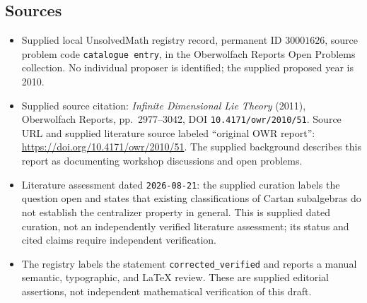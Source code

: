 \documentclass[11pt]{article}
\begin{document}
\subsection{Sources}
\begin{itemize}
\item Supplied local UnsolvedMath registry record, permanent ID \(30001626\), source problem code \texttt{catalogue entry}, in the Oberwolfach Reports Open Problems collection. No individual proposer is identified; the supplied proposed year is 2010.
\item Supplied source citation: \emph{Infinite Dimensional Lie Theory} (2011), Oberwolfach Reports, pp.\ 2977--3042, DOI \texttt{10.4171/owr/2010/51}. Source URL and supplied literature source labeled ``original OWR report'': \url{https://doi.org/10.4171/owr/2010/51}. The supplied background describes this report as documenting workshop discussions and open problems.
\item Literature assessment dated \texttt{2026-08-21}: the supplied curation labels the question open and states that existing classifications of Cartan subalgebras do not establish the centralizer property in general. This is supplied dated curation, not an independently verified literature assessment; its status and cited claims require independent verification.
\item The registry labels the statement \texttt{corrected\_verified} and reports a manual semantic, typographic, and LaTeX review. These are supplied editorial assertions, not independent mathematical verification of this draft.
\end{itemize}
\end{document}
